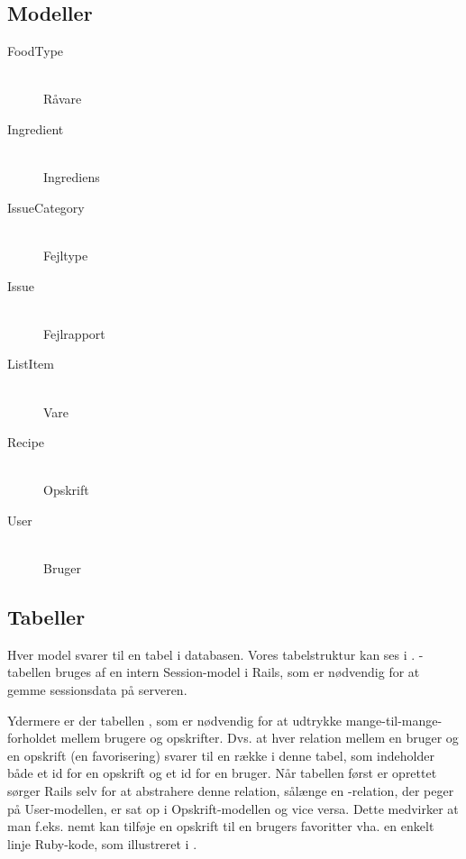 \subsection{Modeller}

\begin{description}

  \item[FoodType] \hfill \\
  Råvare

  \item[Ingredient] \hfill \\
  Ingrediens

  \item[IssueCategory] \hfill \\
  Fejltype

  \item[Issue] \hfill \\
  Fejlrapport

  \item[ListItem] \hfill \\
  Vare

  \item[Recipe] \hfill \\
  Opskrift

  \item[User] \hfill \\
  Bruger

\end{description}
\subsection{Tabeller}
\label{sec:tabeller}

Hver model svarer til en tabel i databasen. Vores tabelstruktur kan ses i . -tabellen bruges af en intern Session-model i Rails, som er nødvendig for at gemme sessionsdata på serveren.

Ydermere er der tabellen , som er nødvendig for at udtrykke mange-til-mange-forholdet mellem brugere og opskrifter. Dvs. at hver relation mellem en bruger og en opskrift (en favorisering) svarer til en række i denne tabel, som indeholder både et id for en opskrift og et id for en bruger. Når tabellen først er oprettet sørger Rails selv for at abstrahere denne relation, sålænge en -relation, der peger på User-modellen, er sat op i Opskrift-modellen og vice versa. Dette medvirker at man f.eks. nemt kan tilføje en opskrift til en brugers favoritter vha. en enkelt linje Ruby-kode, som illustreret i .

